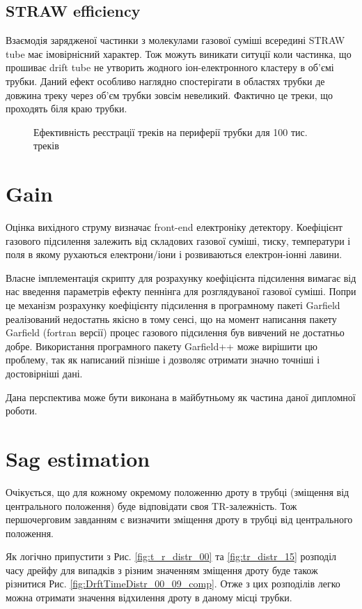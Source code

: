 \documentclass[]{article}
\begin{document}
	\subsection{ STRAW efficiency}
	Взаємодія зарядженої частинки з молекулами газової суміші всередині STRAW tube має імовірнісний характер. Тож можуть виникати ситуції коли частинка, що прошиває drift tube не утворить жодного іон-електронного кластеру в об’ємі трубки. Даний ефект особливо наглядно спостерігати в областях трубки де довжина треку через об’єм трубки зовсім невеликий. Фактично це  треки, що проходять біля краю трубки.
	
	\begin{figure}
		\label{fig:efectiveness }
		\caption{Ефективність реєстрації треків на периферії трубки для 100 тис. треків}
	\end{figure}
	
	\section{Gain}
	Оцінка вихідного струму визначає front-end електроніку детектору. Коефіцієнт газового підсилення залежить від складових газової суміші, тиску, температури і поля в якому рухаються електрони/іони і розвиваються електрон-іонні лавини.
	
	Власне імплементація скрипту для розрахунку коефіцієнта підсилення вимагає від нас введення параметрів ефекту пеннінга \cite{} для розглядуваної газової суміші. Попри це механізм розрахунку коефіцієнту підсилення в програмному пакеті Garfield реалізований недостатнь якісно в тому сенсі, що на момент написання пакету Garfield (fortran версії) процес газового підсилення був вивчений не достатньо добре. Використання програмного пакету Garfield++ може вирішити цю проблему, так як написаний пізніше і дозволяє отримати значно точніші і достовірніші дані.
	
	Дана перспектива може бути виконана в майбутньому як частина даної дипломної роботи.
	
	
	\section{ Sag estimation}
	
	Очікується, що для кожному окремому положенню дроту в трубці (зміщення від центрального положення) буде відповідати своя TR-залежність. Тож першочерговим завданням є визначити зміщення дроту в  трубці від центрального положення.
	
	Як логічно припустити з Рис. \ref{fig:t_r_distr_00} та \ref{fig:tr_distr_15} розподіл часу дрейфу  для випадків з різним значенням зміщення дроту буде також різнитися Рис. \ref{fig:DrftTimeDistr_00_09_comp}.
	Отже з цих розподілів легко можна отримати значення відхилення дроту в даному місці трубки.
	
\end{document}
